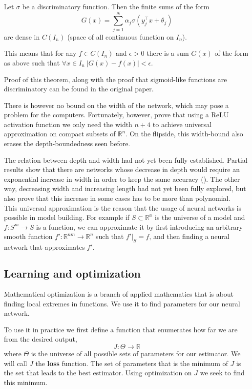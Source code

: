 \begin{thm}
	Let $\sigma$ be a discriminatory function. Then the finite sums of the form $$G(x)=\sum_{j=1}^N\alpha_j\sigma(y_j^\top x+\theta_j)$$ are dense in $C(I_n)$ (space of all continuous function on $I_n$).
	
	This means that for any $f\in C(I_n)$ and $\epsilon>0$ there is a sum $G(x)$ of the form as above such that $\forall x\in I_n\ |G(x)-f(x)|<\epsilon$.
\end{thm}

Proof of this theorem, along with the proof that sigmoid-like functions are discriminatory can be found in the original paper.

There is however no bound on the width of the network, which may pose a problem for the computers. Fortunately, however, \cite{narrownet} prove that using a ReLU activation function we only need the width $n+4$ to achieve universal approximation on compact subsets of $\mathbb{R}^n$. On the flipside, this width-bound also erases the depth-boundedness seen before.

The relation between depth and width had not yet been fully established. Partial results show that there are networks whose decrease in depth would require an exponential increase in width in order to keep the same accuracy (\cite{widthexp}). The other way, decreasing width and increasing length had not yet been fully explored, but \cite{narrownet} also prove that this increase in some cases has to be more than polynomial. \\

This universal approximation is the reason that the usage of neural networks is possible in model building. For example if $S\subset\mathbb{R^n}$ is the universe of a model and $f:S^m\rightarrow S$ is a function, we can approximate it by first introducing an arbitrary smooth function $f':\mathbb{R}^{nm}\rightarrow \mathbb{R}^n$ such that $\left.f'\right|_S=f$, and then finding a neural network that approximates $f'$.

\subsection{Learning and optimization}
Mathematical optimization is a branch of applied mathematics that is about finding local extremes in functions. We use it to find parameters for our neural network.

To use it in practice we first define a function that enumerates how far we are from the desired output, $$J:\Theta\rightarrow\mathbb{R}$$ where $\Theta$ is the universe of all possible sets of parameters for our estimator. We will call $J$ the \textbf{loss} function. The set of parameters that is the minimum of $J$ is the set that leads to the best estimator. Using optimization on $J$ we seek to find this minimum. 

